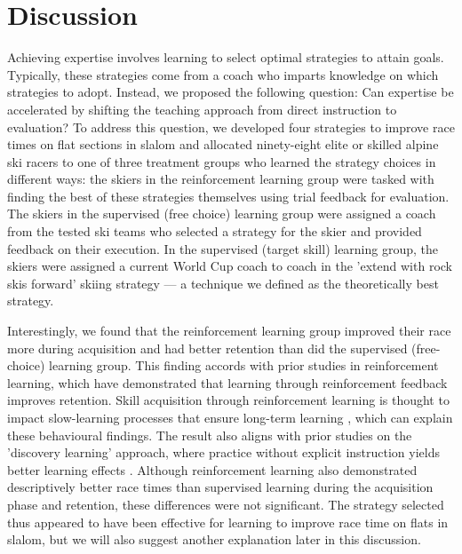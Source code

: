 \documentclass{article}
\begin{document}
\section{Discussion}

Achieving expertise involves learning to select optimal strategies to attain goals. Typically, these strategies come from a coach who imparts knowledge on which strategies to adopt. Instead, we proposed the following question: Can expertise be accelerated by shifting the teaching approach from direct instruction to evaluation? To address this question, we developed four strategies to improve race times on flat sections in slalom and allocated ninety-eight elite or skilled alpine ski racers to one of three treatment groups who learned the strategy choices in different ways: the skiers in the reinforcement learning group were tasked with finding the best of these strategies themselves using trial feedback for evaluation. The skiers in the supervised (free choice) learning group were assigned a coach from the tested ski teams who selected a strategy for the skier and provided feedback on their execution. In the supervised (target skill) learning group, the skiers were assigned a current World Cup coach to coach in the 'extend with rock skis forward' skiing strategy — a technique we defined as the theoretically best strategy. 

Interestingly, we found that the reinforcement learning group improved their race more during acquisition and had better retention than did the supervised (free-choice) learning group. This finding accords with prior studies in reinforcement learning, which have demonstrated that learning through reinforcement feedback improves retention\cite{therrien_effective_2016, truong_error-based_2023, hasson_reinforcement_2015}. Skill acquisition through reinforcement learning is thought to impact slow-learning processes that ensure long-term learning \cite{huang_rethinking_2011}, which can explain these behavioural findings. The result also aligns with prior studies on the 'discovery learning' approach, where practice without explicit instruction yields better learning effects \cite{wulf_instructions_1997, hodges_learning_2001, hodges_role_1999}. Although reinforcement learning also demonstrated descriptively better race times than supervised learning during the acquisition phase and retention, these differences were not significant. The strategy selected thus appeared to have been effective for learning to improve race time on flats in slalom, but we will also suggest another explanation later in this discussion.
\end{document}
